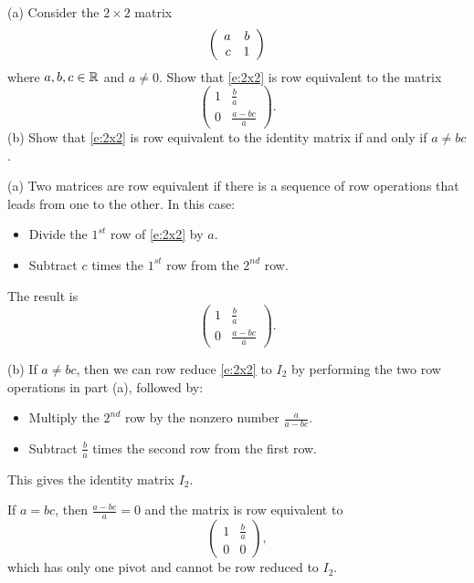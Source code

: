 \documentclass{ximera}
\begin{document}
\begin{exercise} \label{c2.3.8}
(a) Consider the $2\times 2$ matrix
\begin{equation}  \label{e:2x2}
\left(\begin{array}{rr} a & b\\ c &1\end{array}\right)
\end{equation}
where $a,b,c\in\mbox{$\mathbb{R}$}$ and $a\neq 0$.  Show that \eqref{e:2x2}
is row equivalent to the matrix
\[
\left(\begin{array}{cc} 1 & \frac{b}{a} \\ 0 & \frac{a-bc}{a}
\end{array} \right).
\]
(b)  Show that \eqref{e:2x2} is row equivalent to the
identity matrix if and only if $a\neq bc$.

\begin{solution}
\soln 
(a)
Two matrices are row equivalent if there is a sequence of row operations
that leads from one to the other.  In this case:
\begin{itemize}
\item Divide the $1^{st}$ row of \eqref{e:2x2} by $a$.

\item Subtract $c$ times the $1^{st}$ row from the $2^{nd}$ row.
\end{itemize}
The result is
\[
\left(\begin{array}{cc} 1 & \frac{b}{a} \\ 0 & \frac{a - bc}{a}\end{array}
\right).
\]

(b) If $a \neq bc$, then we can row reduce \eqref{e:2x2} to $I_2$ by
performing the two row operations in part (a), followed by:

\begin{itemize}
\item Multiply the $2^{nd}$ row by the nonzero number $\frac{a}{a - bc}$.

\item  Subtract $\frac{b}{a}$ times the second row from the first row.
\end{itemize}

This gives the identity matrix $I_2$.

\para If $a = bc$, then $\frac{a - bc}{a} = 0$ and the matrix is row equivalent to
\[
\left(\begin{array}{cc} 1 & \frac{b}{a} \\ 0 & 0\end{array} \right),
\]
which has only one pivot and cannot be row reduced to $I_2$.

\end{solution}
\end{exercise}
\end{document}
